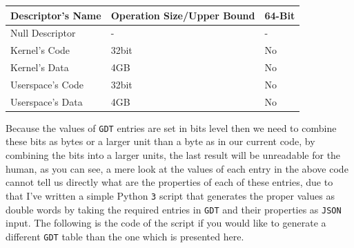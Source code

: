 \begin{longtable}[]{@{}lll@{}}
\toprule
Descriptor's Name & Operation Size/Upper Bound & 64-Bit\tabularnewline
\midrule
\endhead
Null Descriptor & - & -\tabularnewline
Kernel's Code & 32bit & No\tabularnewline
Kernel's Data & 4GB & No\tabularnewline
Userspace's Code & 32bit & No\tabularnewline
Userspace's Data & 4GB & No\tabularnewline
\bottomrule
\end{longtable}

Because the values of \lstinline!GDT! entries are set in bits level then
we need to combine these bits as bytes or a larger unit than a byte as
in our current code, by combining the bits into a larger units, the last
result will be unreadable for the human, as you can see, a mere look at
the values of each entry in the above code cannot tell us directly what
are the properties of each of these entries, due to that I've written a
simple Python \lstinline!3! script that generates the proper values as
double words by taking the required entries in \lstinline!GDT! and their
properties as \lstinline!JSON! input. The following is the code of the
script if you would like to generate a different \lstinline!GDT! table
than the one which is presented here.

